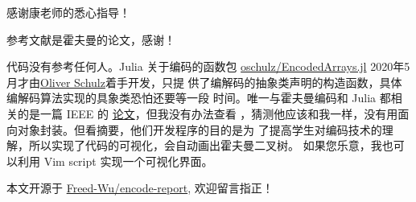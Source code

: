 \documentclass[../main]{subfiles}
\begin{document}
\begin{acknowledgement}

  感谢康老师的悉心指导！

  参考文献是霍夫曼的论文，感谢！
  
  代码没有参考任何人。Julia 关于编码的函数包
  \href{https://github.com/oschulz/EncodedArrays.jl}{oschulz/EncodedArrays.jl}
  2020年5月才由\href{https://github.com/oschulz}{Oliver Schulz}着手开发，只提
  供了编解码的抽象类声明的构造函数，具体编解码算法实现的具象类恐怕还要等一段
  时间。唯一与霍夫曼编码和 Julia 都相关的是一篇 IEEE 的
  \href{https://ieeexplore.ieee.org/document/7754207}{论文}，但我没有办法查看
  ，猜测他应该和我一样，没有用面向对象封装。但看摘要，他们开发程序的目的是为
  了提高学生对编码技术的理解，所以实现了代码的可视化，会自动画出霍夫曼二叉树。
  如果您乐意，我也可以利用 Vim script 实现一个可视化界面。

  本文开源于
  \href{https://github.com/Freed-Wu/encode-report}{Freed-Wu/encode-report},
  欢迎留言指正！
\end{acknowledgement}
\end{document}
